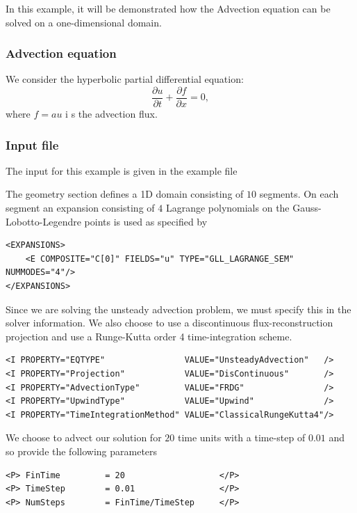 In this example, it will be demonstrated how the Advection equation can be
solved on a one-dimensional domain.

\subsubsection{Advection equation}
We consider the hyperbolic partial differential equation:
\begin{equation}
\dfrac{\partial u}{\partial t} + \dfrac{\partial f}{\partial x} = 0,
\end{equation}
where $f =  a u$ i s the advection flux.

\subsubsection{Input file}
The input for this example is given in the example file 

The geometry section defines a 1D domain consisting of $10$ segments. On each
segment an expansion consisting of $4$ Lagrange polynomials on the
Gauss-Lobotto-Legendre points is used as specified by
\begin{lstlisting}[style=XMLStyle]
<EXPANSIONS>
    <E COMPOSITE="C[0]" FIELDS="u" TYPE="GLL_LAGRANGE_SEM" NUMMODES="4"/>
</EXPANSIONS>
\end{lstlisting}

Since we are solving the unsteady advection problem, we must specify this in the
solver information. We also choose to use a discontinuous flux-reconstruction
projection and use a Runge-Kutta order 4 time-integration scheme.
\begin{lstlisting}[style=XMLStyle]
<I PROPERTY="EQTYPE"                VALUE="UnsteadyAdvection"   />
<I PROPERTY="Projection"            VALUE="DisContinuous"       />
<I PROPERTY="AdvectionType"         VALUE="FRDG"                />
<I PROPERTY="UpwindType"            VALUE="Upwind"              />
<I PROPERTY="TimeIntegrationMethod" VALUE="ClassicalRungeKutta4"/>
\end{lstlisting}

We choose to advect our solution for $20$ time units with a time-step of $0.01$
and so provide the following parameters
\begin{lstlisting}[style=XMLStyle]
<P> FinTime         = 20                   </P>
<P> TimeStep        = 0.01                 </P>
<P> NumSteps        = FinTime/TimeStep     </P>
\end{lstlisting}

